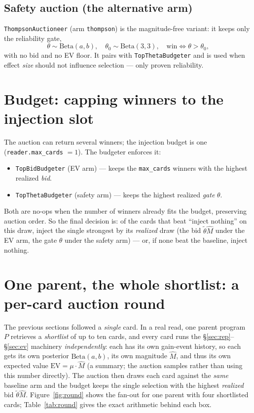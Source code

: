 \documentclass[11pt]{article}
\newcommand{\code}[1]{\texttt{\small #1}}
\newcommand{\Beta}{\mathrm{Beta}}
\begin{document}
\subsection{Safety auction (the alternative arm)}

\code{ThompsonAuctioneer} (arm \code{thompson}) is the magnitude-free variant: it
keeps only the reliability gate,
\[
  \theta \sim \Beta(a,b), \quad \theta_0 \sim \Beta(3,3), \quad
  \text{win} \iff \theta > \theta_0,
\]
with no bid and no EV floor. It pairs with \code{TopThetaBudgeter} and is used when
effect \emph{size} should not influence selection --- only proven reliability.

\section{Budget: capping winners to the injection slot}

The auction can return several winners; the injection budget is one
(\code{reader.max\_cards} $=1$). The budgeter enforces it:
\begin{itemize}[nosep]
  \item \code{TopBidBudgeter} (EV arm) --- keeps the \code{max\_cards} winners with
        the highest realized \emph{bid}.
  \item \code{TopThetaBudgeter} (safety arm) --- keeps the highest realized
        \emph{gate} $\theta$.
\end{itemize}
Both are no-ops when the number of winners already fits the budget, preserving
auction order. So the final decision is: of the cards that beat ``inject nothing''
on this draw, inject the single strongest by its \emph{realized} draw (the bid
$\tilde\theta\hat M$ under the EV arm, the gate $\theta$ under the safety arm) ---
or, if none beat the baseline, inject nothing.

\section{One parent, the whole shortlist: a per-card auction round}
\label{sec:round}

The previous sections followed a \emph{single} card. In a real read, one parent
program~$P$ retrieves a \emph{shortlist} of up to ten cards, and every card runs
the \S\ref{sec:rep}--\S\ref{sec:ev} machinery \emph{independently}: each has its own
gain-event history, so each gets its own posterior $\Beta(a,b)$, its own magnitude
$\hat M$, and thus its own expected value $\mathrm{EV}=\mu\cdot\hat M$ (a summary; the
auction samples rather than using this number directly). The auction then draws each
card against the \emph{same} baseline arm and the budget keeps the single selection
with the highest \emph{realized} bid $\tilde\theta\hat M$. Figure~\ref{fig:round}
shows the fan-out for one parent with four shortlisted cards; Table~\ref{tab:round}
gives the exact arithmetic behind each box.
\end{document}
